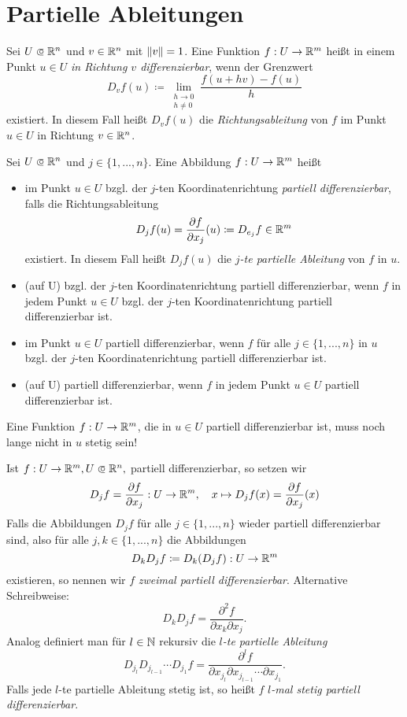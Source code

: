 \documentclass{cheat-sheet}
\begin{document}
\section{Partielle Ableitungen}

\begin{defn}
Sei $U \opn \R^n$ und $v \in \mathbb{R}^n$ mit $\lVert v\rVert = 1$. Eine Funktion $f : U \to \mathbb{R}^m$ heißt in einem Punkt $u \in U$ \emph{in Richtung $v$ differenzierbar}, wenn der Grenzwert
\[ D_v f(u) \coloneqq \lim_{\substack{h \to 0\\h \not= 0}} \frac{f(u + hv) - f(u)}{h} \]
existiert. In diesem Fall heißt $D_v f(u)$ die \emph{Richtungsableitung} von $f$ im Punkt $u \in U$ in Richtung $v \in \mathbb{R}^n$.
\end{defn}

\begin{defn}
Sei $U \opn \R^n$ und $j \in \{ 1, ..., n \}$. Eine Abbildung $f : U \to \mathbb{R}^m$ heißt
\begin{itemize}
  \item im Punkt $u \in U$ bzgl. der $j$-ten Koordinatenrichtung \emph{partiell differenzierbar}, falls die Richtungsableitung
  \[ D_j f(u) = \frac{\partial f}{\partial x_j}(u) \coloneqq D_{e_j} f \in \mathbb{R}^m \]
  existiert. In diesem Fall heißt $D_j f(u)$ die \emph{$j$-te partielle Ableitung} von $f$ in $u$.
  \item (auf U) bzgl. der $j$-ten Koordinatenrichtung partiell differenzierbar, wenn $f$ in jedem Punkt $u \in U$ bzgl. der $j$-ten Koordinatenrichtung partiell differenzierbar ist.
  \item im Punkt $u \in U$ partiell differenzierbar, wenn $f$ für alle $j \in \{ 1, ..., n \}$ in $u$ bzgl. der $j$-ten Koordinatenrichtung partiell differenzierbar ist.
  \item (auf U) partiell differenzierbar, wenn $f$ in jedem Punkt $u \in U$ partiell differenzierbar ist.
\end{itemize}
\end{defn}

\begin{acht}
Eine Funktion $f : U \to \mathbb{R}^m$, die in $u \in U$ partiell differenzierbar ist, muss noch lange nicht in $u$ stetig sein!
\end{acht}

\begin{defn}
Ist $f : U \to \R^m, U \opn \R^n,$ partiell differenzierbar, so setzen wir
\[ D_j f = \frac{\partial f}{\partial x_j} : U \to \mathbb{R}^m,\quad x \mapsto D_j f(x) = \frac{\partial f}{\partial x_j}(x) \]
Falls die Abbildungen $D_j f$ für alle $j \in \{ 1, ..., n \}$ wieder partiell differenzierbar sind, also für alle $j, k \in \{ 1, ..., n \}$ die Abbildungen
\[ D_k D_j f \coloneqq D_k (D_j f) : U \to \mathbb{R}^m \]
existieren, so nennen wir $f$ \emph{zweimal partiell differenzierbar}. Alternative Schreibweise:
\[ D_k D_j f = \frac{\partial^2 f}{\partial x_k \partial x_j}. \]
Analog definiert man für $l \in \mathbb{N}$ rekursiv die \emph{$l$-te partielle Ableitung}
\[ D_{j_l} D_{j_{l-1}} \cdots D_{j_1} f = \frac{\partial^l f}{\partial x_{j_l} \partial x_{j_{l-1}} \cdots \partial x_{j_1}}. \]
Falls jede $l$-te partielle Ableitung stetig ist, so heißt $f$ \emph{$l$-mal stetig partiell differenzierbar}.
\end{defn}
\end{document}
